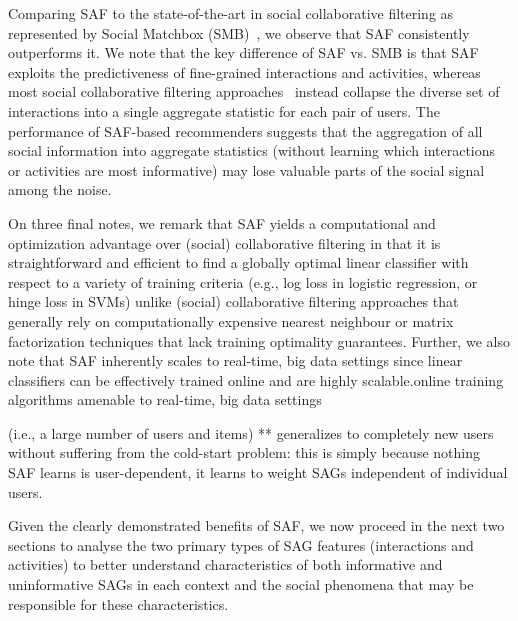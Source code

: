 Comparing SAF to the state-of-the-art in social collaborative
filtering as represented by Social Matchbox (SMB)~\cite{Noel2012NOF},
we observe that SAF consistently outperforms it.  We note that the key
difference of SAF vs. SMB is that SAF exploits the predictiveness of
fine-grained interactions and activities, whereas most
social collaborative filtering
approaches~\cite{socinf,rrmf,ste,sorec,sr,Noel2012NOF,lla} instead
collapse the diverse set of interactions into a single aggregate
statistic for each pair of users.  The performance of SAF-based
recommenders suggests that the aggregation of all social information
into aggregate statistics (without learning which interactions or
activities are most informative) may lose valuable parts of the social
signal among the noise.

On three final notes, we remark that SAF yields a computational and
optimization advantage over (social) collaborative filtering in that
it is straightforward and efficient to find a globally optimal linear
classifier with respect to a variety of training criteria (e.g., 
log loss in logistic regression, or hinge loss in SVMs) unlike (social)
collaborative filtering approaches that generally rely on
computationally expensive nearest neighbour or matrix factorization
techniques that lack training optimality guarantees.  Further, we also
note that SAF inherently scales to real-time, big data settings 
since linear classifiers can be effectively trained online 
and are highly scalable.online training algorithms
amenable to real-time, big data settings


(i.e., a large number
of users and items) ** generalizes to completely new users without suffering
from the cold-start problem: this is simply because nothing SAF learns
is user-dependent, it learns to weight SAGs independent of individual  
users. %

Given the clearly demonstrated benefits of SAF, we now proceed in the
next two sections to analyse the two primary types of SAG features
(interactions and activities) to better understand characteristics of
both informative and uninformative SAGs in each context and the social
phenomena that may be responsible for these characteristics.
